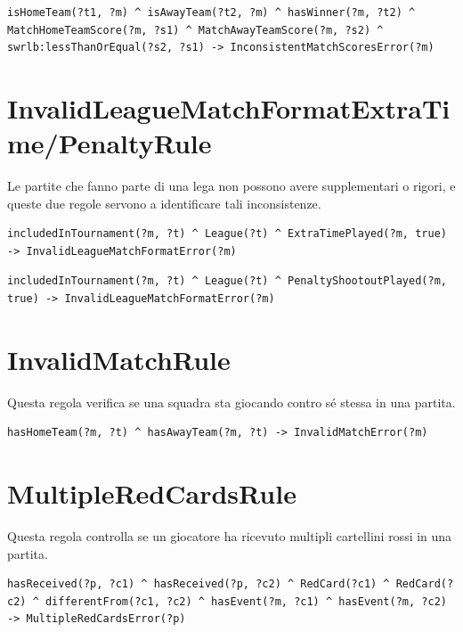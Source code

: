 \documentclass[11pt]{report} %
\begin{document}
\begin{itemize}[leftmargin=*]
\begin{lstlisting}[language=SWRL]
isHomeTeam(?t1, ?m) ^ isAwayTeam(?t2, ?m) ^ hasWinner(?m, ?t2) ^ MatchHomeTeamScore(?m, ?s1) ^ MatchAwayTeamScore(?m, ?s2) ^ swrlb:lessThanOrEqual(?s2, ?s1) -> InconsistentMatchScoresError(?m)
\end{lstlisting}

\section{InvalidLeagueMatchFormatExtraTime/PenaltyRule}

Le partite che fanno parte di una lega non possono avere supplementari o rigori, e queste due regole servono a identificare tali inconsistenze.

\begin{lstlisting}[language=SWRL]
includedInTournament(?m, ?t) ^ League(?t) ^ ExtraTimePlayed(?m, true) -> InvalidLeagueMatchFormatError(?m)
\end{lstlisting}

\begin{lstlisting}[language=SWRL]
includedInTournament(?m, ?t) ^ League(?t) ^ PenaltyShootoutPlayed(?m, true) -> InvalidLeagueMatchFormatError(?m)
\end{lstlisting}

\section{InvalidMatchRule}

Questa regola verifica se una squadra sta giocando contro sé stessa in una partita.

\begin{lstlisting}[language=SWRL]
hasHomeTeam(?m, ?t) ^ hasAwayTeam(?m, ?t) -> InvalidMatchError(?m)
\end{lstlisting}

\section{MultipleRedCardsRule}

Questa regola controlla se un giocatore ha ricevuto multipli cartellini rossi in una partita.

\begin{lstlisting}[language=SWRL]
hasReceived(?p, ?c1) ^ hasReceived(?p, ?c2) ^ RedCard(?c1) ^ RedCard(?c2) ^ differentFrom(?c1, ?c2) ^ hasEvent(?m, ?c1) ^ hasEvent(?m, ?c2) -> MultipleRedCardsError(?p)
\end{lstlisting}


\end{itemize}
\end{document}
